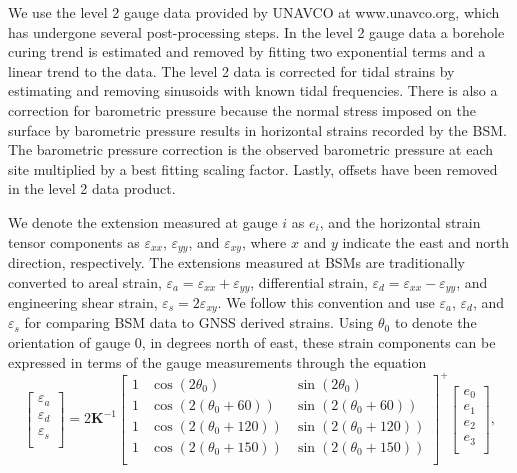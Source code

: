 \documentclass[10pt,a4paper]{article}
\begin{document}
We use the level 2 gauge data provided by UNAVCO at www.unavco.org, which has undergone several post-processing steps. In the level 2 gauge data a borehole curing trend is estimated and removed by fitting two exponential terms and a linear trend to the data. The level 2 data is corrected for tidal strains by estimating and removing sinusoids with known tidal frequencies. There is also a correction for barometric pressure because the normal stress imposed on the surface by barometric pressure results in horizontal strains recorded by the BSM. The barometric pressure correction is the observed barometric pressure at each site multiplied by a best fitting scaling factor. Lastly, offsets have been removed in the level 2 data product.    

We denote the extension measured at gauge $i$ as $e_i$, and the horizontal strain tensor components as $\varepsilon_{xx}$, $\varepsilon_{yy}$, and $\varepsilon_{xy}$, where $x$ and $y$ indicate the east and north direction, respectively. The extensions measured at BSMs are traditionally converted to areal strain, $\varepsilon_a = \varepsilon_{xx} + \varepsilon_{yy}$, differential strain, $\varepsilon_d = \varepsilon_{xx} - \varepsilon_{yy}$, and engineering shear strain, $\varepsilon_s = 2\varepsilon_{xy}$. We follow this convention and use $\varepsilon_a$, $\varepsilon_d$, and $\varepsilon_s$ for comparing BSM data to GNSS derived strains. Using $\theta_0$ to denote the orientation of gauge 0, in degrees north of east, these strain components can be expressed in terms of the gauge measurements through the equation 
\begin{equation}\label{eq:GaugeToStrain}
\left[\begin{array}{c}
\varepsilon_a \\
\varepsilon_d \\
\varepsilon_s \\
\end{array}\right]
=
2\mathbf{K}^{-1}\left[\begin{array}{ccc}
1 & \cos(2\theta_0) & \sin(2\theta_0) \\
1 & \cos(2(\theta_0 + 60)) & \sin(2(\theta_0 + 60)) \\
1 & \cos(2(\theta_0 + 120)) & \sin(2(\theta_0 + 120)) \\
1 & \cos(2(\theta_0 + 150)) & \sin(2(\theta_0 + 150)) \\
\end{array}\right]^+
\left[\begin{array}{c}
e_0 \\
e_1 \\
e_2 \\
e_3 \\
\end{array}\right],
\end{equation} 
\end{document}
